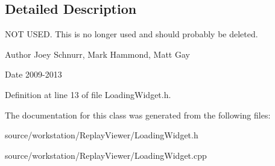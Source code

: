 \subsection{Detailed Description}
N\-O\-T U\-S\-E\-D. This is no longer used and should probably be deleted. 

\begin{DoxyAuthor}{Author}
Joey Schnurr, Mark Hammond, Matt Gay 
\end{DoxyAuthor}
\begin{DoxyDate}{Date}
2009-\/2013 
\end{DoxyDate}


Definition at line 13 of file Loading\-Widget.\-h.



The documentation for this class was generated from the following files\-:\begin{DoxyCompactItemize}
\item 
source/workstation/\-Replay\-Viewer/Loading\-Widget.\-h\item 
source/workstation/\-Replay\-Viewer/Loading\-Widget.\-cpp\end{DoxyCompactItemize}
